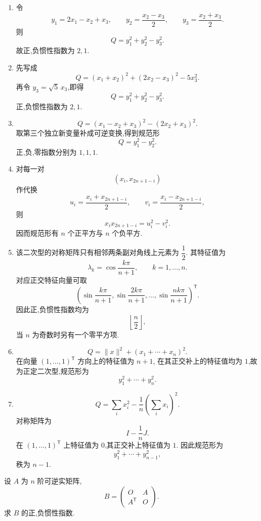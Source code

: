 \begin{solution}
\leavevmode
\begin{enumerate}
    \item 令
    \[
    y_1=2x_1-x_2+x_3,\qquad
    y_2=\dfrac{x_2-x_3}{2},\qquad
    y_3=\dfrac{x_2+x_3}{2}.
    \]
    则
    \[
    Q=y_1^2+y_2^2-y_3^2.
    \]
    故正,负惯性指数为 $2,1$.

    \item 先写成
    \[
    Q=(x_1+x_2)^2+(2x_2-x_3)^2-5x_3^2.
    \]
    再令 $y_3=\sqrt5\,x_3$,即得
    \[
    Q=y_1^2+y_2^2-y_3^2.
    \]
    正,负惯性指数为 $2,1$.

    \item
    \[
    Q=(x_1-x_2+x_3)^2-(2x_2+x_3)^2.
    \]
    取第三个独立新变量补成可逆变换,得到规范形
    \[
    Q=y_1^2-y_2^2.
    \]
    正,负,零指数分别为 $1,1,1$.

    \item 对每一对
    \[
    (x_i,x_{2n+1-i})
    \]
    作代换
    \[
    u_i=\dfrac{x_i+x_{2n+1-i}}{2},
    \qquad
    v_i=\dfrac{x_i-x_{2n+1-i}}{2},
    \]
    则
    \[
    x_ix_{2n+1-i}=u_i^2-v_i^2.
    \]
    因而规范形有 $n$ 个正平方与 $n$ 个负平方.

    \item 该二次型的对称矩阵只有相邻两条副对角线上元素为 $\dfrac12$.
    其特征值为
    \[
    \lambda_k=\cos\dfrac{k\pi}{n+1},
    \qquad k=1,\ldots,n.
    \]
    对应正交特征向量可取
    \[
    \left(
    \sin\dfrac{k\pi}{n+1},
    \sin\dfrac{2k\pi}{n+1},
    \ldots,
    \sin\dfrac{nk\pi}{n+1}
    \right)^{\mathsf T}.
    \]
    因此正,负惯性指数均为
    \[
    \left\lfloor\dfrac n2\right\rfloor,
    \]
    当 $n$ 为奇数时另有一个零平方项.

    \item
    \[
    Q=\|x\|^2+(x_1+\cdots+x_n)^2.
    \]
    在向量 $(1,\ldots,1)^{\mathsf T}$ 方向上的特征值为 $n+1$,
    在其正交补上的特征值均为 $1$,故为正定二次型,规范形为
    \[
    y_1^2+\cdots+y_n^2.
    \]

    \item
    \[
    Q=
    \sum\limits_i x_i^2
    -
    \dfrac1n
    \left(\sum\limits_i x_i\right)^2.
    \]
    对称矩阵为
    \[
    I-\dfrac1nJ.
    \]
    在 $(1,\ldots,1)^{\mathsf T}$ 上特征值为 $0$,其正交补上特征值为 $1$.
    因此规范形为
    \[
    y_1^2+\cdots+y_{n-1}^2,
    \]
    秩为 $n-1$.
\end{enumerate}
\end{solution}


\begin{example}
设 $A$ 为 $n$ 阶可逆实矩阵,
\[
B=
\begin{pmatrix}
O&A\\
A^{\mathsf T}&O
\end{pmatrix}.
\]
求 $B$ 的正,负惯性指数.
\end{example}
\exampleblank

